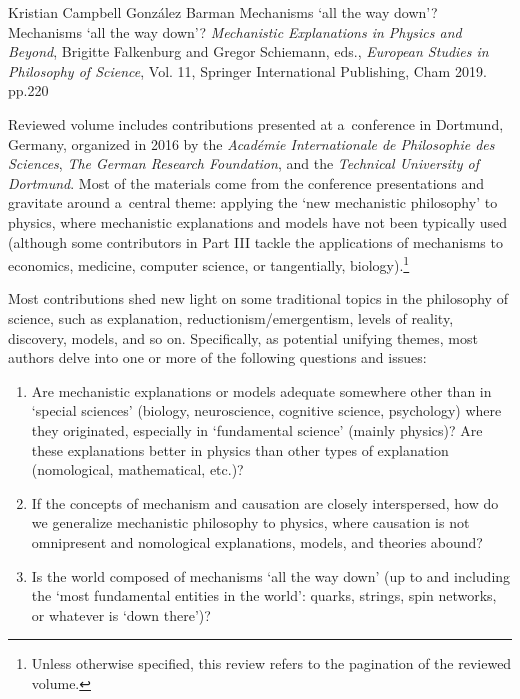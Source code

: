 \begin{recengenv}{Kristian Campbell González Barman}
	{Mechanisms ‘all the way down'?}
	{Mechanisms ‘all the way down'?}
	{\textit{Mechanistic Explanations in Physics and Beyond}, Brigitte Falkenburg and Gregor Schiemann, eds., \textit{European Studies in Philosophy of Science}, Vol. 11, Springer International Publishing, Cham 2019. pp.220}
	


Reviewed volume includes contributions presented at a~conference in Dortmund, Germany, organized in 2016 by the \textit{Académie Internationale de Philosophie des Sciences}, \textit{The German Research Foundation}, and the \textit{Technical University of Dortmund}. Most of the materials come from the conference presentations and gravitate around a~central theme: applying the ‘new mechanistic philosophy' to physics, where mechanistic explanations and models have not been typically used (although some contributors in Part III tackle the applications of mechanisms to economics, medicine, computer science, or tangentially, biology).\footnote{Unless otherwise specified, this review refers to the pagination of the reviewed
\parencite[][]{falkenburg_mechanistic_2019} %
 volume.}

Most contributions shed new light on some traditional topics in the philosophy of science, such as explanation, reductionism/emergentism, levels of reality, discovery, models, and so on. Specifically, as potential unifying themes, most authors delve into one or more of the following questions and issues:

\begin{enumerate}[label={(\arabic*)}]
\item Are mechanistic explanations or models adequate somewhere other than in ‘special sciences' (biology, neuroscience, cognitive science, psychology) where they originated, especially in ‘fundamental science' (mainly physics)? Are these explanations better in physics than other types of explanation (nomological, mathematical, etc.)?

\item If the concepts of mechanism and causation are closely interspersed, how do we generalize mechanistic philosophy to physics, where causation is not omnipresent and nomological explanations, models, and theories abound?

\item Is the world composed of mechanisms ‘all the way down' (up to and including the ‘most fundamental entities in the world': quarks, strings, spin networks, or whatever is ‘down there')?


\end{enumerate}
\end{recengenv}
